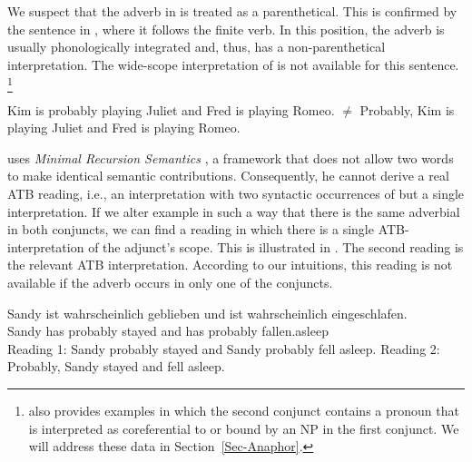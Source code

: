 \documentclass[output=paper]{langsci/langscibook}
\begin{document}




We suspect that the adverb in  is treated as a parenthetical. This is confirmed by the sentence in , where it follows the finite verb. 
In this position, 
the adverb is usually phonologically integrated and, thus, has a non-parenthetical interpretation. 
The wide-scope interpretation of  is not available for this sentence.%
\footnote{\citet{Chaves:07} also provides examples in which the second conjunct contains a pronoun that is interpreted as coreferential to or bound by an NP in the first conjunct. 
We will address these data in Section~\ref{Sec-Anaphor}.
}


\ea
\label{romeojuliet2}
Kim is probably playing Juliet and Fred is playing Romeo.
\glt $\not=$ Probably, Kim is playing Juliet and Fred is playing Romeo.
\z 

\citet{Chaves:07} uses \emph{Minimal Recursion Semantics} \citep{Copestake:al:05}, a
 framework that does not allow two words to make identical semantic contributions. Consequently,
he cannot derive a real ATB reading, i.e., an interpretation with two syntactic occurrences of  but a single interpretation.  
If we alter example  in such a way that there is the same adverbial in both conjuncts, we can find a reading in which there is a single ATB-interpretation of the adjunct's scope. This is illustrated in . The second reading is the relevant ATB interpretation. According to our intuitions, this reading is not available if the adverb  occurs in only one of the conjuncts.

\ea \label{stay-asleep-ATB}
\gll Sandy ist wahrscheinlich geblieben und ist wahrscheinlich eingeschlafen.\\
Sandy has probably stayed and has probably fallen.asleep\\
\glt {}
\glt Reading 1: Sandy probably stayed and Sandy probably fell asleep.
\glt Reading 2: Probably, Sandy stayed and fell asleep.
\z 
\end{document}
